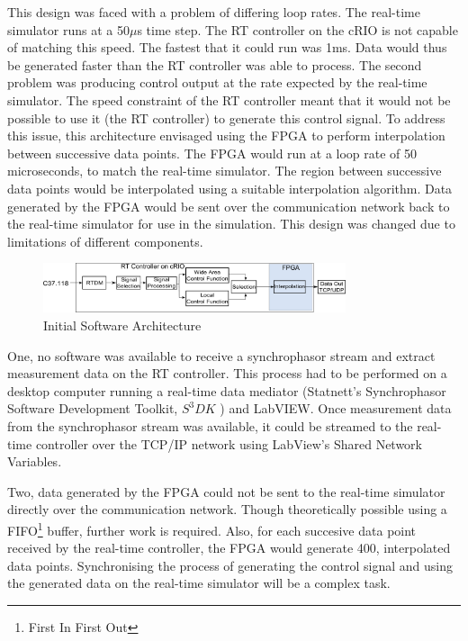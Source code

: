 \documentclass[conference]{IEEEtran}
\begin{document}
This design was faced with a problem of differing loop rates. The real-time simulator runs at a 50$\mu$s time step. The RT controller on the cRIO is not capable of matching this speed. The fastest that it could run was 1ms. Data would thus be generated faster than the RT controller was able to process. The second problem was producing control output at the rate expected by the real-time simulator. The speed constraint of the RT controller meant that it would not be possible to use it (the RT controller) to generate this control signal. To address this issue, this architecture envisaged using the FPGA to perform interpolation between successive data points. The FPGA would run at a loop rate of 50 microseconds, to match the real-time simulator. The region between successive data points would be interpolated using a suitable interpolation algorithm. Data generated by the FPGA would be sent over the communication network back to the real-time simulator for use in the simulation. This design was changed due to limitations of different components. 

\begin{figure}[!t]
\includegraphics[width=3.5in]{InitialArch}
\caption{Initial Software Architecture}
\label{fig:InitialArch}
\end{figure}

One, no software was available to receive a synchrophasor stream and extract measurement data on the RT controller. This process had to be performed on a desktop computer running a real-time data mediator (Statnett's Synchrophasor Software Development Toolkit, $S^{3}DK$ \cite{SDK}) and LabVIEW. Once measurement data from the synchrophasor stream was available, it could be streamed to the real-time controller over the TCP/IP network using LabView's Shared Network Variables.

Two, data generated by the FPGA could not be sent to the real-time simulator directly over the communication network. Though theoretically possible using a FIFO\footnote{First In First Out} buffer, further work is required. Also, for each succesive data point received by the real-time controller, the FPGA would generate 400, interpolated data points. Synchronising the process of generating the control signal and using the generated data on the real-time simulator will be a complex task.
\end{document}
